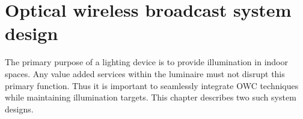 \chapter{Optical wireless broadcast system design}
\label{chapter:system}
\thispagestyle{myheadings}

The primary purpose of a lighting device is to provide illumination in indoor spaces. Any value added services within the luminaire must not disrupt this primary function. Thus it is important to seamlessly integrate OWC techniques while maintaining illumination targets. This chapter describes two such system designs.



